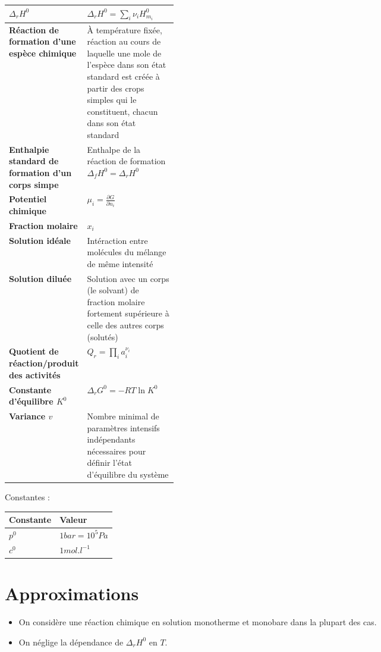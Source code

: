 \documentclass[12pt,a4paper] {article}
\begin{document}
\begin{tabularx}{\linewidth}{|>{\bfseries}p{0.33\linewidth}|X|}
    $\Delta_r H^0$ & $\Delta_r H^0 = \sum_i \nu_i H_{m_i}^0$ \\ \hline
    Réaction de formation d'une espèce chimique & À température fixée, réaction au cours de laquelle une mole de l'espèce dans son état standard est créée à partir des crops simples qui le constituent, chacun dans son état standard \\ \hline
    Enthalpie standard de formation d'un corps simpe & Enthalpe de la réaction de formation $\Delta_f H^0 = \Delta_r H^0$ \\ \hline
    Potentiel chimique & $\mu_i = \frac{\partial G}{\partial n_i}$ \\ \hline
    Fraction molaire & $x_i$ \\ \hline
    Solution idéale & Intéraction entre molécules du mélange de même intensité \\ \hline
    Solution diluée & Solution avec un corps (le solvant) de fraction molaire fortement supérieure à celle des autres corps (solutés) \\ \hline
    Quotient de réaction/produit des activités & $Q_r = \prod_i a_i^{\nu_i}$ \\ \hline
    Constante d'équilibre $K^0$ & $\Delta_r G^0 = -RT\ln K^0$ \\ \hline
    Variance $v$ & Nombre minimal de paramètres intensifs indépendants nécessaires pour définir l'état d'équilibre du système \\ \hline
\end{tabularx}

Constantes : \\
\begin{center}\begin{tabular}{|l|l|} \hline
    \bf{Constante} & \bf{Valeur} \\ \hline
    $p^0$ & $1 bar = 10^5 Pa$ \\ \hline
    $c^0$ & $1mol.l^{-1}$ \\ \hline
\end{tabular}\end{center}

\section{Approximations}
\begin{itemize}
    \item On considère une réaction chimique en solution monotherme et monobare dans la plupart des cas.
    \item On néglige la dépendance de $\Delta_r H^0$ en $T$.
\end{itemize}
\end{document}
